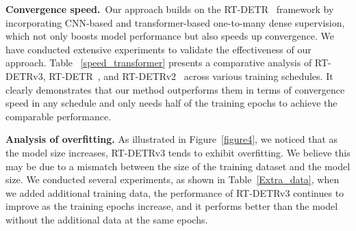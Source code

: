 \documentclass[10pt,twocolumn,letterpaper]{article}
\begin{document}
\begin{table}[]
\caption{\textbf{Analysis of overfitting.} Extra data represents the Object365 dataset~\cite{shao2019obj365}.}
\label{Extra_data}
\end{table}


\textbf{Convergence speed.}~Our approach builds on the RT-DETR~\cite{zhao2024rt-detr} framework by incorporating CNN-based and transformer-based one-to-many dense supervision, which not only boosts model performance but also speeds up convergence. We have conducted extensive experiments to validate the effectiveness of our approach. Table ~\ref{speed_transformer} presents a comparative analysis of RT-DETRv3, RT-DETR~\cite{zhao2024rt-detr}, and RT-DETRv2~\cite{lv2024rt-detrv2} across various training schedules. It clearly demonstrates that our method outperforms them in terms of convergence speed in any schedule and only needs half of the training epochs to achieve the comparable performance.

\textbf{Analysis of overfitting.} As illustrated in Figure~\ref{figure4}, we noticed that as the model size increases, RT-DETRv3 tends to exhibit overfitting. We believe this may be due to a mismatch between the size of the training dataset and the model size. We conducted several experiments, as shown in Table~\ref{Extra_data}, when we added additional training data, the performance of RT-DETRv3 continues to improve as the training epochs increase, and it performs better than the model without the additional data at the same epochs.
\end{document}
